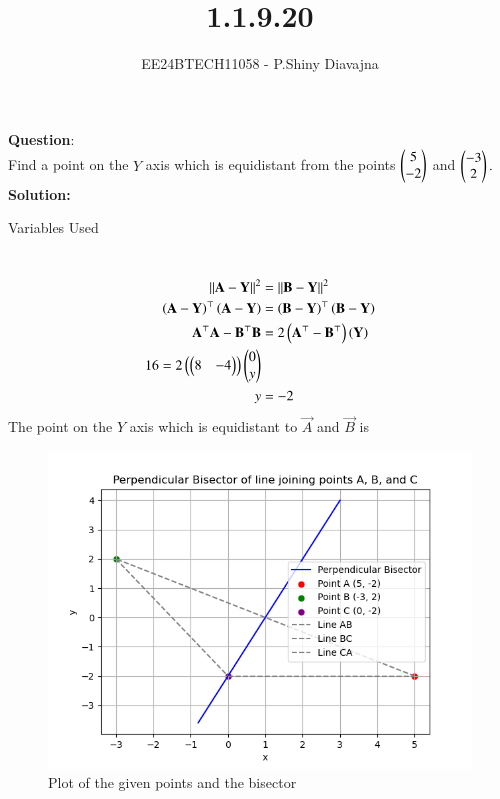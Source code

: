 \documentclass[journal]{IEEEtran}
\begin{document}

\vspace{3cm}

\title{1.1.9.20}
\author{EE24BTECH11058 - P.Shiny Diavajna}
{\let\newpage\relax\maketitle}

\renewcommand{\thefigure}{\theenumi}
\renewcommand{\thetable}{\theenumi}
\setlength{\intextsep}{10pt} %


\renewcommand{\thetable}{\theenumi}


\textbf{Question}:\\
Find a point on the $Y$ axis which is equidistant from the points  $\begin{pmatrix}5\\-2\end{pmatrix}$ and $\begin{pmatrix}-3\\2\end{pmatrix}.$
\\
\textbf{Solution: }
\begin{table}[h!]    
  \centering
  
  \caption{Variables Used}
  \label{tab10.5.3.9.1}
\end{table}\\
\begin{align}
\left\lVert\mathbf{A}-\mathbf{Y}\right\rVert^2&=\left\lVert\mathbf{B}-\mathbf{Y}\right\rVert^2\\
	\left(\mathbf{A}-\mathbf{Y}\right)^\top\left(\mathbf{A}-\mathbf{Y}\right)&=\left(\mathbf{B}-\mathbf{Y}\right)^\top\left(\mathbf{B}-\mathbf{Y}\right)\\
	\mathbf{{A}^\top}\mathbf{A}-\mathbf{B^\top}\mathbf{B}&=2\left(\mathbf{A}^\top-\mathbf{B}^\top\right)\left(\mathbf{Y}\right)\\
	16=2\left(\begin{pmatrix}8&-4\end{pmatrix}\right)\begin{pmatrix}0\\y\end{pmatrix}\\
y&=-2
\end{align}
The point on the $Y$ axis which is equidistant to $\vec{A}$ and $\vec{B}$ is 
\begin{figure}[h!]
   \centering
   \includegraphics[width=0.7\linewidth]{figs/fig.png}
   \caption{Plot of the given points and the bisector}
\end{figure}  
\end{document}
